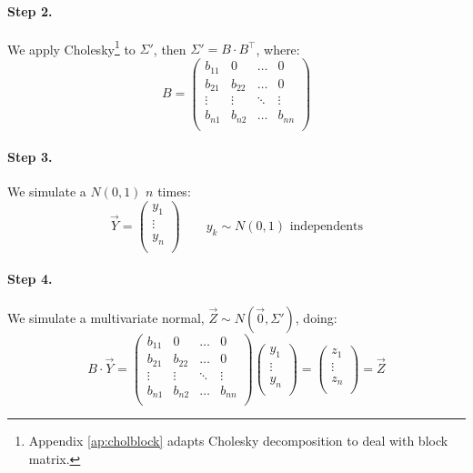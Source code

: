 \documentclass[a4paper,12pt,final]{article}
\begin{document}
\paragraph{Step 2.} We apply Cholesky\footnote{Appendix \ref{ap:cholblock} adapts Cholesky 
decomposition to deal with block matrix.} to $\Sigma'$, then $\Sigma' = B \cdot B^{\top}$, 
where:
\begin{displaymath}
B = 
\left(
\begin{array}{cccc}
b_{11}   & 0        & \ldots & 0       \\
b_{21}   & b_{22}   & \ldots & 0       \\
\vdots  & \vdots  & \ddots & \vdots    \\
b_{n1}   & b_{n2}   & \ldots & b_{nn}  \\
\end{array}
\right)
\end{displaymath}

\paragraph{Step 3.} We simulate a $N(0,1)$ $n$ times:
\begin{displaymath}
\vec{Y} =
\left(
\begin{array}{c}
y_1    \\
\vdots \\
y_n    \\
\end{array}
\right) 
\qquad y_k \sim N(0,1) \textrm{ independents}
\end{displaymath}

\paragraph{Step 4.} We simulate a multivariate normal, $\vec{Z} \sim N(\vec{0}, \Sigma')$, 
doing:
\begin{displaymath}
B \cdot \vec{Y} 
=
\left(
\begin{array}{cccc}
b_{11}   & 0        & \ldots & 0       \\
b_{21}   & b_{22}   & \ldots & 0       \\
\vdots  & \vdots  & \ddots & \vdots    \\
b_{n1}   & b_{n2}   & \ldots & b_{nn}  \\
\end{array}
\right)
\left(
\begin{array}{c}
y_1    \\
\vdots \\
y_n    \\
\end{array}
\right) 
=
\left(
\begin{array}{c}
z_1    \\
\vdots \\
z_n    \\
\end{array}
\right) 
= 
\vec{Z}
\end{displaymath}
\end{document}
